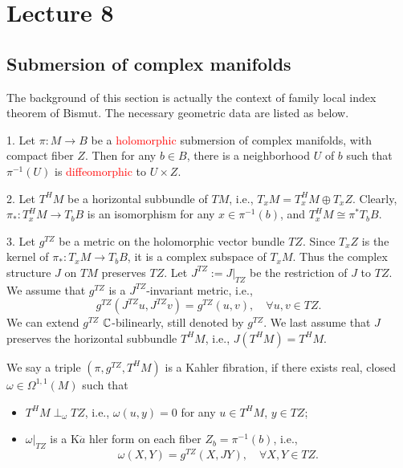 \section{Lecture 8}
\label{sec:lecture-8}
\setcounter{equation}{0}

\subsection*{Submersion of complex manifolds}

The background of this section is actually the context of family local index
theorem of Bismut. The necessary geometric data are listed as below.

1. Let $\pi:M\to B$ be a \textcolor{red}{holomorphic} submersion of complex manifolds, with compact
fiber $Z$. Then for any $b\in B$, there is a neighborhood $U$ of $b$ such that
$\pi^{-1}(U)$ is \textcolor{red}{diffeomorphic} to $U\times Z$. 

2. Let $T^HM$ be a horizontal subbundle of $TM$, i.e., $T_xM=T^H_xM\oplus T_xZ$. Clearly,
$\pi_*:T^H_xM\to T_bB$ is an isomorphism for any $x\in \pi^{-1}(b)$, and $T^H_xM\cong \pi^*T_bB$.

3. Let $g^{TZ}$ be a metric on the holomorphic vector bundle $TZ$. Since $T_xZ$ is the kernel
of $\pi_*:T_xM\to T_bB$, it is a complex subspace of $T_xM$. Thus the complex structure $J$ on $TM$
preserves $TZ$. Let $J^{TZ}:=J{|_{TZ}}$ be the restriction of $J$ to $TZ$. We assume that $g^{TZ}$ is a
$J^{TZ}$-invariant metric, i.e., 
\begin{equation*}
    g^{TZ}(J^{TZ}u,J^{TZ}v)=g^{TZ}(u,v),\quad \forall u,v\in TZ.
\end{equation*}
We can extend $g^{TZ}$ $\mathbb{C}$-bilinearly, still denoted by $g^{TZ}$. 
We last assume that $J$ preserves the horizontal subbundle $T^HM$, i.e., $J(T^HM)=T^HM$.

\begin{definition}
    We say a triple $(\pi,g^{TZ},T^HM)$ is a Kahler fibration, if there exists real, closed $\omega\in\Omega^{1,1}(M)$ such that 
    \begin{itemize}
        \item $T^HM\perp_\omega TZ$, i.e., $\omega(u,y)=0$ for any $u\in T^HM$, $y\in TZ$;
        \item $\omega{|_{TZ}}$ is a K$\ddot{a}$ hler form on each fiber $Z_b=\pi^{-1}(b)$, i.e., 
        \begin{equation*}
            \omega(X, Y)=g^{TZ}(X,JY),\quad \forall X,Y\in TZ.
        \end{equation*}
    \end{itemize}

\end{definition}
